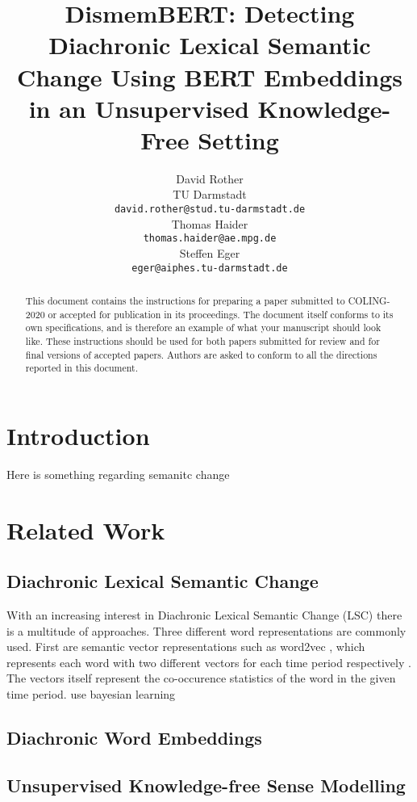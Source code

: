 \documentclass[11pt]{article}
\title{DismemBERT: Detecting Diachronic Lexical Semantic Change Using BERT Embeddings in an Unsupervised Knowledge-Free Setting}
\author{David Rother \\
  TU Darmstadt \\
  {\tt david.rother@stud.tu-darmstadt.de} \\\And
  Thomas Haider \\
  {\tt thomas.haider@ae.mpg.de} \\\And
  Steffen Eger \\
  {\tt eger@aiphes.tu-darmstadt.de} \\}
\date{}
\begin{document}
\maketitle
\begin{abstract}
  This document contains the instructions for preparing a paper submitted
  to COLING-2020 or accepted for publication in its proceedings. The document itself
  conforms to its own specifications, and is therefore an example of
  what your manuscript should look like. These instructions should be
  used for both papers submitted for review and for final versions of
  accepted papers. Authors are asked to conform to all the directions
  reported in this document.
\end{abstract}

\section{Introduction}
Here is something regarding semanitc change \cite{schlechtweg2018diachronic}

\section{Related Work}

\subsection{Diachronic Lexical Semantic Change}
With an increasing interest in Diachronic Lexical Semantic Change (LSC)  
there is a multitude of approaches. 
Three different word representations are commonly used. 
First are semantic vector representations such as word2vec \cite{mikolov2013efficient},
which represents each word with two different vectors for each time period respectively \cite{hamilton2016cultural,hamilton2016diachronic}.
The vectors itself represent the co-occurence statistics of the word in the given time period.
\cite{frermann2016bayesian} use 
bayesian learning 

\subsection{Diachronic Word Embeddings}

\subsection{Unsupervised Knowledge-free Sense Modelling}
\end{document}
